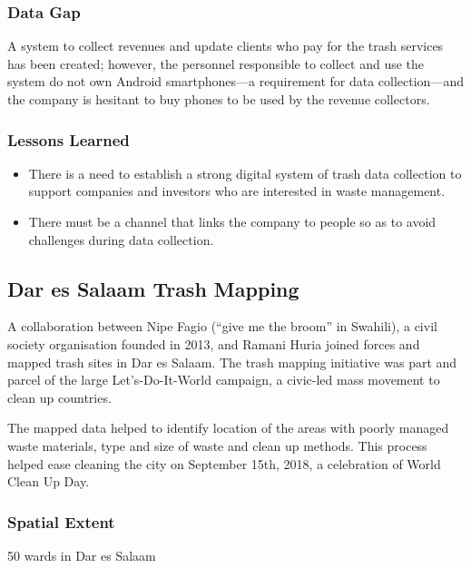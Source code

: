 \documentclass[a4paper,12pt,twoside]{article}
\begin{document}
\subsubsection{Data Gap}
A system to collect revenues and update clients who pay for the trash services has been created; however, the personnel responsible to collect and use the system do not own Android smartphones---a requirement for data collection---and the company is hesitant to buy phones to be used by the revenue collectors.

\subsubsection{Lessons Learned}
\begin{itemize}
    \item There is a need to establish  a strong digital system of trash data collection to support companies and investors who are interested in waste management.
    \item There must be a channel that links the company to people so as to avoid challenges during data collection.
\end{itemize}

\newpage
\subsection{Dar es Salaam Trash Mapping}
A collaboration between Nipe Fagio (“give me the broom” in Swahili), a civil society organisation founded in 2013, and Ramani Huria joined forces and mapped trash sites in Dar es Salaam. The trash mapping initiative was part and parcel of the large Let’s-Do-It-World campaign, a civic-led mass movement to clean up countries.
\medskip

The mapped data helped to identify location of the areas with poorly managed waste materials, type and size of waste and clean up methods. This process helped ease cleaning the city on September 15th, 2018, a celebration of World Clean Up Day.

\subsubsection{Spatial Extent}
50 wards in Dar es Salaam
\end{document}
